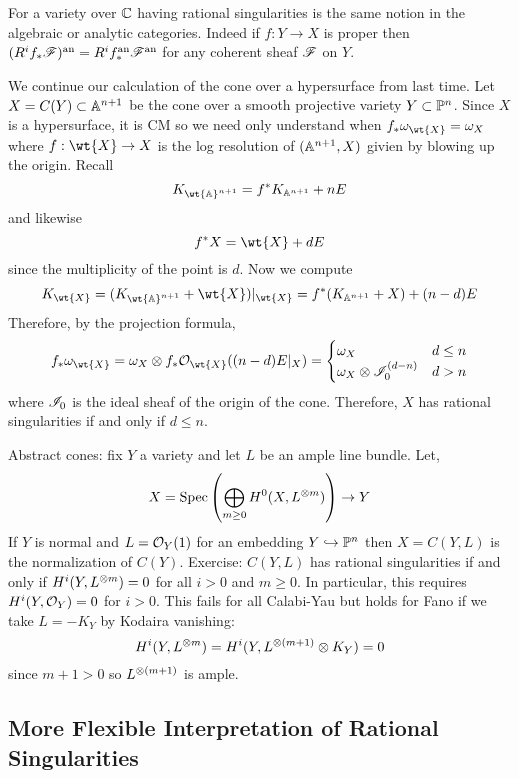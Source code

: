 \documentclass[12pt]{article}
\begin{document}
\begin{rmk}
For a variety over $\CC$ having rational singularities is the same notion in the algebraic or analytic categories. Indeed if $f : Y \to X$ is proper then $(R^i f_* \F)^\an = R^i f^{\an}_* \F^{\an}$ for any coherent sheaf $\F$ on $Y$.
\end{rmk}

\begin{example}
We continue our calculation of the cone over a hypersurface from last time. Let $X = C(Y) \subset \A^{n+1}$ be the cone over a smooth projective variety $Y \subset \P^n$. Since $X$ is a hypersurface, it is CM so we need only understand when $f_* \omega_{\wt{X}} = \omega_X$ where $f : \wt{X} \to X$ is the log resolution of $(\A^{n+1}, X)$ givien by blowing up the origin. Recall
\[ K_{\wt{\A}^{n+1}} = f^* K_{\A^{n+1}} + n E \]
and likewise
\[ f^* X = \wt{X} + d E \]
since the multiplicity of the point is $d$. Now we compute
\[ K_{\wt{X}} = (K_{\wt{\A}^{n+1}} + \wt{X})|_{\wt{X}} = f^* (K_{\A^{n+1}} + X) + (n-d) E \]
Therefore, by the projection formula,
\[ f_* \omega_{\wt{X}} = \omega_{X} \ot f_* \struct{\wt{X}}((n-d)E|_X) = \begin{cases}
\omega_X & d \le n
\\
\omega_X \ot \I_0^{(d - n)} & d > n
\end{cases} \]
where $\I_0$ is the ideal sheaf of the origin of the cone. Therefore, $X$ has rational singularities if and only if $d \le n$. 
\end{example}

\begin{example}
Abstract cones: fix $Y$ a variety and let $L$ be an ample line bundle. Let, 
\[ X = \Spec{ \bigoplus_{m \ge 0} H^0(X, L^{\ot m}) } \to Y \]
If $Y$ is normal and $L = \struct{Y}(1)$ for an embedding $Y \embed \P^n$ then $X = C(Y,L)$ is the normalization of $C(Y)$. Exercise: $C(Y, L)$ has rational singularities if and only if $H^i(Y, L^{\ot m}) = 0$ for all $i > 0$ and $m \ge 0$. In particular, this requires $H^i(Y, \struct{Y}) = 0$ for $i > 0$. This fails for all Calabi-Yau but holds for Fano if we take $L = -K_Y$ by Kodaira vanishing:
\[ H^i(Y, L^{\ot m}) = H^i(Y, L^{\ot (m+1)} \ot K_Y) = 0 \]
since $m + 1 > 0$ so $L^{\ot (m+1)}$ is ample. 
\end{example}

\subsection{More Flexible Interpretation of Rational Singularities}
\end{document}

